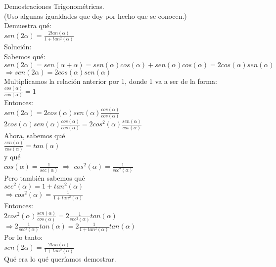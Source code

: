 \documentclass[a4paper,11pt]{article}
\title{}
\author{}
\begin{document}
Demostraciones Trigonométricas.\\

(Uso algunas igualdades que doy por hecho que se conocen.)\\

Demuestra qué:\\

$sen(2\alpha) = \frac{2tan(\alpha)}{1+tan^2 (\alpha)}$\\

Solución:\\

Sabemos qué:\\

$sen(2\alpha)=sen(\alpha+\alpha)=sen(\alpha)cos(\alpha)+sen(\alpha)cos(\alpha)=2cos(\alpha)sen(\alpha)$\\

$\Rightarrow sen(2\alpha)=2cos(\alpha)sen(\alpha)$\\

Multiplicamos la relación anterior por 1, donde 1 va a ser de la forma:\\

$\frac{cos(\alpha)}{cos(\alpha)}=1$\\

Entonces:\\

$sen(2\alpha)=2cos(\alpha)sen(\alpha)\frac{cos(\alpha)}{cos(\alpha)}$\\

$2cos(\alpha)sen(\alpha)\frac{cos(\alpha)}{cos(\alpha)}=2cos^2(\alpha)\frac{sen(\alpha)}{cos(\alpha)}$\\

Ahora, sabemos qué\\

$\frac{sen(\alpha)}{cos(\alpha)}= tan(\alpha)$\\

y qué\\

$cos(\alpha)=\frac{1}{sec(\alpha)}$ $\Rightarrow$ $cos^2(\alpha)=\frac{1}{sec^2(\alpha)}$\\

Pero también sabemos qué\\

$sec^2(\alpha)=1+tan^2(\alpha)$\\

$\Rightarrow cos^2(\alpha)=\frac{1}{1+tan^2(\alpha)}$\\

Entonces:\\

$2cos^2(\alpha)\frac{sen(\alpha)}{cos(\alpha)}=2\frac{1}{sec^2(\alpha)}tan(\alpha)$\\

$\Rightarrow 2\frac{1}{sec^2(\alpha)}tan(\alpha)=2\frac{1}{1+tan^2(\alpha)}tan(\alpha)$\\

Por lo tanto:\\

$sen(2\alpha) = \frac{2tan(\alpha)}{1+tan^2 (\alpha)}$\\

Qué era lo qué queríamos demostrar.\\
\end{document}
